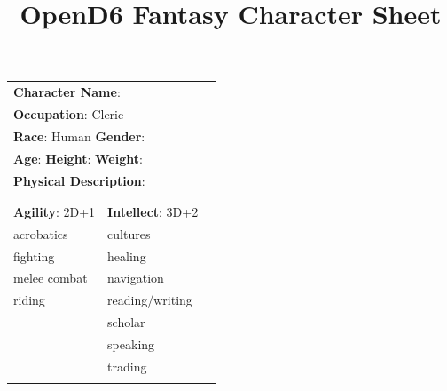 \documentclass[10pt]{article}
\title{OpenD6 Fantasy Character Sheet}
\begin{document}
\pagestyle{fancy}
\fancyhf{}
\fancyfoot[R]{\thepage}
\renewcommand{\headrulewidth}{0pt}


\cleardoublepage
\begin{table}
\begin{tabular}{m{156pt} m{156pt} m{156pt}}
    \multicolumn{2}{l}{\textbf{Character Name}:  \hrulefill} \\
    \multicolumn{2}{l}{\textbf{Occupation}: Cleric \hrulefill} \\
    \multicolumn{2}{l}{\textbf{Race}: Human \hrulefill \hspace{1em} \textbf{Gender}:  \hrulefill} \\
    \multicolumn{2}{l}{\textbf{Age}:  \hrulefill \hspace{1em} \textbf{Height}:  \hrulefill \hspace{1em}  \textbf{Weight}:  \hrulefill } \\
    \multicolumn{2}{l}{\textbf{Physical Description}:  \hrulefill } \\
    \multicolumn{2}{l}{ \hrulefill } \\
 & & \\
\textbf{Agility}: 2D+1 \hrulefill      & \textbf{Intellect}: 3D+2 \hrulefill  &                             \\

acrobatics           \hrulefill & cultures             \hrulefill & \\

fighting             \hrulefill & healing              \hrulefill & \\

melee combat         \hrulefill & navigation           \hrulefill & \\

riding               \hrulefill & reading/writing      \hrulefill & \\

 \hrulefill & scholar              \hrulefill & \\

 \hrulefill & speaking             \hrulefill & \\

 \hrulefill & trading              \hrulefill & \\

 \hrulefill &  \hrulefill & \\


\end{tabular}
\end{table}
\end{document}
